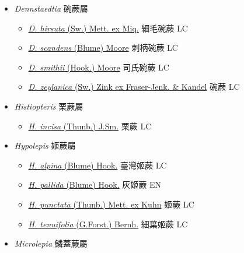 
  \begin{itemize}
 \item[    ] \textit{Dennstaedtia} 碗蕨屬
                                
  \begin{itemize}
        \item[] \href{http://www.theplantlist.org/tpl1.1/search?q=Dennstaedtia+hirsuta}{\textit{D. hirsuta} (Sw.) Mett. ex Miq.}   細毛碗蕨   LC
        \item[] \href{http://www.theplantlist.org/tpl1.1/search?q=Dennstaedtia+scandens}{\textit{D. scandens} (Blume) Moore}   刺柄碗蕨   LC
        \item[] \href{http://www.theplantlist.org/tpl1.1/search?q=Dennstaedtia+smithii}{\textit{D. smithii} (Hook.) Moore}   司氏碗蕨   LC
        \item[] \href{http://www.theplantlist.org/tpl1.1/search?q=Dennstaedtia+zeylanica}{\textit{D. zeylanica} (Sw.) Zink ex Fraser-Jenk. \& Kandel}   碗蕨   LC
  \end{itemize}
 \item[    ] \textit{Histiopteris} 栗蕨屬
                                
  \begin{itemize}
        \item[] \href{http://www.theplantlist.org/tpl1.1/search?q=Histiopteris+incisa}{\textit{H. incisa} (Thunb.) J.Sm.}   栗蕨   LC
  \end{itemize}
 \item[    ] \textit{Hypolepis} 姬蕨屬
                                
  \begin{itemize}
        \item[] \href{http://www.theplantlist.org/tpl1.1/search?q=Hypolepis+alpina}{\textit{H. alpina} (Blume) Hook.}   臺灣姬蕨   LC
        \item[] \href{http://www.theplantlist.org/tpl1.1/search?q=Hypolepis+pallida}{\textit{H. pallida} (Blume) Hook.}   灰姬蕨   EN
        \item[] \href{http://www.theplantlist.org/tpl1.1/search?q=Hypolepis+punctata}{\textit{H. punctata} (Thunb.) Mett. ex Kuhn}   姬蕨   LC
        \item[] \href{http://www.theplantlist.org/tpl1.1/search?q=Hypolepis+tenuifolia}{\textit{H. tenuifolia} (G.Forst.) Bernh.}   細葉姬蕨   LC
  \end{itemize}
 \item[    ] \textit{Microlepia} 鱗蓋蕨屬
                                

\end{itemize}
